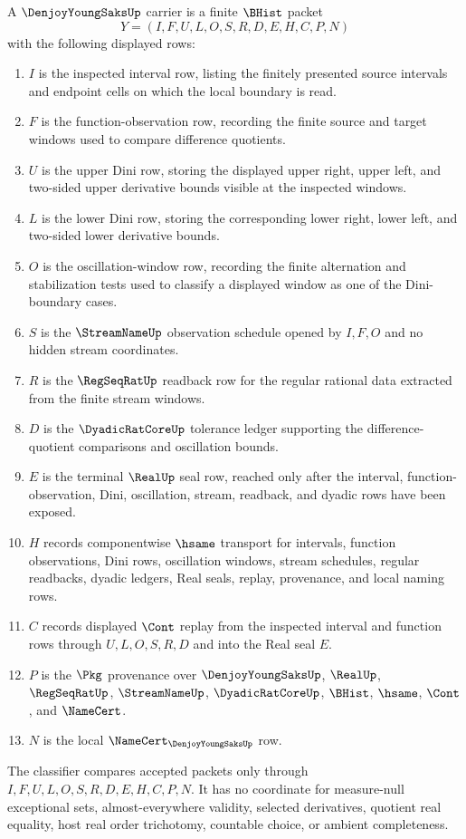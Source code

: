 \begin{definition}\label{def:denjoy-young-saks-carrier}
A $\DenjoyYoungSaksUp$ carrier is a finite $\BHist$ packet
$$
Y=(I,F,U,L,O,S,R,D,E,H,C,P,N)
$$
with the following displayed rows:
\begin{enumerate}
\item $I$ is the inspected interval row, listing the finitely presented source intervals and endpoint cells on which the local boundary is read.
\item $F$ is the function-observation row, recording the finite source and target windows used to compare difference quotients.
\item $U$ is the upper Dini row, storing the displayed upper right, upper left, and two-sided upper derivative bounds visible at the inspected windows.
\item $L$ is the lower Dini row, storing the corresponding lower right, lower left, and two-sided lower derivative bounds.
\item $O$ is the oscillation-window row, recording the finite alternation and stabilization tests used to classify a displayed window as one of the Dini-boundary cases.
\item $S$ is the $\StreamNameUp$ observation schedule opened by $I,F,O$ and no hidden stream coordinates.
\item $R$ is the $\RegSeqRatUp$ readback row for the regular rational data extracted from the finite stream windows.
\item $D$ is the $\DyadicRatCoreUp$ tolerance ledger supporting the difference-quotient comparisons and oscillation bounds.
\item $E$ is the terminal $\RealUp$ seal row, reached only after the interval, function-observation, Dini, oscillation, stream, readback, and dyadic rows have been exposed.
\item $H$ records componentwise $\hsame$ transport for intervals, function observations, Dini rows, oscillation windows, stream schedules, regular readbacks, dyadic ledgers, Real seals, replay, provenance, and local naming rows.
\item $C$ records displayed $\Cont$ replay from the inspected interval and function rows through $U,L,O,S,R,D$ and into the Real seal $E$.
\item $P$ is the $\Pkg$ provenance over $\DenjoyYoungSaksUp$, $\RealUp$, $\RegSeqRatUp$, $\StreamNameUp$, $\DyadicRatCoreUp$, $\BHist$, $\hsame$, $\Cont$, and $\NameCert$.
\item $N$ is the local $\NameCert_{\DenjoyYoungSaksUp}$ row.
\end{enumerate}
The classifier compares accepted packets only through $I,F,U,L,O,S,R,D,E,H,C,P,N$. It has no coordinate for measure-null exceptional sets, almost-everywhere validity, selected derivatives, quotient real equality, host real order trichotomy, countable choice, or ambient completeness.
\end{definition}


